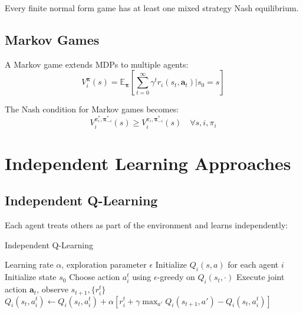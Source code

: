 \begin{theorem}
Every finite normal form game has at least one mixed strategy Nash equilibrium.
\end{theorem}

\subsection{Markov Games}

A Markov game extends MDPs to multiple agents:
\begin{equation}
V_i^\boldsymbol{\pi}(s) = \mathbb{E}_{\boldsymbol{\pi}} \left[ \sum_{t=0}^\infty \gamma^t r_i(s_t, \mathbf{a}_t) \bigg| s_0 = s \right]
\end{equation}

The Nash condition for Markov games becomes:
\begin{equation}
V_i^{\pi_i^*, \boldsymbol{\pi}_{-i}^*}(s) \geq V_i^{\pi_i, \boldsymbol{\pi}_{-i}^*}(s) \quad \forall s, i, \pi_i
\end{equation}

\section{Independent Learning Approaches}

\subsection{Independent Q-Learning}

Each agent treats others as part of the environment and learns independently:

\begin{algorithm}
\caption{Independent Q-Learning}
\begin{algorithmic}
\REQUIRE Learning rate $\alpha$, exploration parameter $\epsilon$
\STATE Initialize $Q_i(s,a)$ for each agent $i$
    \STATE Initialize state $s_0$
            \STATE Choose action $a_i^t$ using $\epsilon$-greedy on $Q_i(s_t, \cdot)$
        \ENDFOR
        \STATE Execute joint action $\mathbf{a}_t$, observe $s_{t+1}, \{r_i^t\}$
            \STATE $Q_i(s_t, a_i^t) \leftarrow Q_i(s_t, a_i^t) + \alpha [r_i^t + \gamma \max_{a'} Q_i(s_{t+1}, a') - Q_i(s_t, a_i^t)]$
        \ENDFOR
    \ENDFOR
\ENDFOR
\end{algorithmic}
\end{algorithm}

